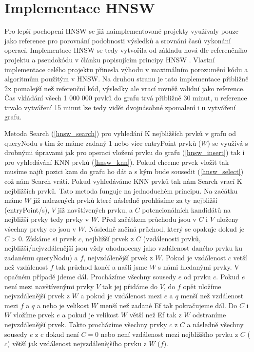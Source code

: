 \documentclass[czech,semestral,dept460,male,csharp,cpdeclaration]{diploma}
\begin{document}
		\section{Implementace HNSW}
		
		Pro lepší pochopení HNSW se již naimplementované projekty \cite{git-hnswlib} \cite{git-hnsw} využívaly pouze jako reference pro porovnání podobnosti výsledků a srovnání časů vykonání operací. Implementace HNSW se tedy vytvořila od základu nová dle referenčního projektu a pseudokódu v článku popisujícím principy HNSW \cite{malkov2018efficient}. Vlastní implementace celého projektu přinesla výhodu v maximálním porozumění kódu a algoritmům použitým v HNSW. Na druhou stranu je tato implementace přibližně 2x pomalejší než referenční kód, výsledky ale vrací rovněž validní jako reference. Čas vkládání všech 1 000 000 prvků do grafu trvá přibližně 30 minut, u reference trvalo vytváření 15 minut lze tedy vidět dvojnásobné zpomalení i u vytváření grafu.
		
		\label{MS}
		Metoda Search (\ref{hnsw_search}) pro vyhledání K nejbližších prvků v grafu od queryNodu s tím že máme zadaný 1 nebo více entryPoint prvků ($W$) se využívá s drobnými úpravami jak pro operaci vložení prvku do grafu (\ref{hnsw_insert}) tak i pro vyhledávání KNN prvků (\ref{hnsw_knn}). Pokud chceme prvek vložit tak musíme najít pozici kam do grafu ho dát a s kým bude sousedit (\ref{hnsw_select}) což nám Search vrátí. Pokud vyhledáváme KNN prvků tak nám Search vrací K nejbližších prvků. Tato metoda funguje na jednoduchém principu. Na začátku máme $W$ již nalezených prvků které následně prohlásíme za ty nejbližší (entryPoint/s), $V$ již navštívených prvku, a $C$ potencionálních kandidátů na nejbližší prvky tedy prvky v $W$. Před začátkem průchodu jsou v $C$ i $V$ uloženy všechny prvky co jsou v $W$. Následně začíná průchod, který se opakuje dokud je $C > 0$. Získáme si prvek $c$, nejbližší prvek z $C$ (vzdálenosti prvků, nejbližší/nejvzdálenější jsou vždy ohodnoceny jako vzdálenost daného prvku ku zadanému queryNodu) a $f$, nejvzdálenější prvek z $W$. Pokud je vzdálenost $c$ vetší než vzdálenost $f$ tak průchod končí a našli jsme $W$ s námi hledanými prvky. V opačném případě jdeme dál. Procházíme všechny sousedy $e$ od prvku $c$. Pokud $e$ není mezi navštívenými prvky $V$ tak jej přidáme do $V$, do $f$ opět uložíme nejvzdálenější prvek z $W$ a pokud je vzdálenost mezi $e$ a $q$ menší než vzdálenost mezi $f$ a $q$ a nebo je velikost $W$ menší než zadané Ef tak pokračujeme dál. Do $C$ i $W$ vložíme prvek $e$ a pokud je velikost $W$ větší než Ef tak z $W$ odstraníme nejvzdálenější prvek. Takto procházíme všechny prvky $c$ z $C$ a následně všechny sousedy $e$ z $c$ dokud není $C = 0$ nebo není vzdálenost mezi nejbližšího prvku z $C$ ($c$) větší jak vzdálenost nejvzdálenějšího prvku z $W$ ($f$).
		
\end{document}
